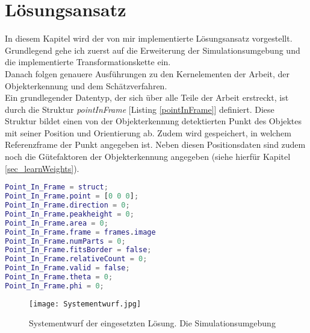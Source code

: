 \cleardoublepage
\section{Lösungsansatz}
In diesem Kapitel wird der von mir implementierte Lösungsansatz vorgestellt. Grundlegend gehe ich zuerst auf die Erweiterung der Simulationsumgebung und die implementierte Transformationskette ein.\\
Danach folgen genauere Ausführungen zu den Kernelementen der Arbeit, der Objekterkennung und dem Schätzverfahren.\\

Ein grundlegender Datentyp, der sich über alle Teile der Arbeit erstreckt, ist durch die Struktur \textit{pointInFrame} [Listing \ref{pointInFrame}] definiert. Diese Struktur bildet einen von der Objekterkennung detektierten Punkt des Objektes mit seiner Position und Orientierung ab. Zudem wird gespeichert, in welchem Referenzframe der Punkt angegeben ist. Neben diesen Positionsdaten sind zudem noch die Gütefaktoren der Objekterkennung angegeben (siehe hierfür Kapitel \ref{sec_learnWeights}).

\begin{lstlisting}[language=Matlab,caption={Initialisierung der \textit{pointInFrame}-Struktur, die erkannte Punkte in verschiedenen Referenzkoordinatensystemen abbildet.}, label = pointInFrame]
Point_In_Frame = struct;
Point_In_Frame.point = [0 0 0];
Point_In_Frame.direction = 0;
Point_In_Frame.peakheight = 0;
Point_In_Frame.area = 0;
Point_In_Frame.frame = frames.image
Point_In_Frame.numParts = 0;
Point_In_Frame.fitsBorder = false;
Point_In_Frame.relativeCount = 0;
Point_In_Frame.valid = false;
Point_In_Frame.theta = 0;
Point_In_Frame.phi = 0;
\end{lstlisting}

\begin{figure}[H]
\texttt{[image: Systementwurf.jpg]}
\caption[Systementwurf]{Systementwurf der eingesetzten Lösung. Die Simulationsumgebung }
\end{figure}